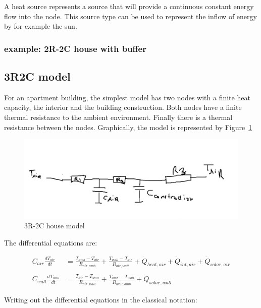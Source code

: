 A heat source represents a source that will provide a continuous constant energy flow into the node. This source type can be used to represent the inflow of energy by for example the sun. 

\subsubsection{example: 2R-2C house with buffer}

   
\subsection{3R2C model}

For an apartment building, the simplest model has two nodes with a finite heat capacity, the interior and the building construction. Both nodes have a finite thermal resistance to the ambient environment. Finally there is a thermal resistance between the nodes. Graphically, the model is represented by Figure~\ref{fig:3R2C}

\begin{figure}[H]
	\centering
	\includegraphics[width=0.7\columnwidth]{Pictures/3R2Cmodel}
	\caption[Short title]{3R-2C house model}
	\label{fig:3R2C}
\end{figure} 

The differential equations are:

\begin{equation}
	\begin{aligned}
		C_{air}\frac{dT_{air}}{dt} &=\frac{T_{amb}-T_{air}}{R_{air, amb}} + \frac{T_{wall}-T_{air}}{R_{air, wall}} + \dot{Q}_{heat, air} + \dot{Q}_{int, air} + \dot{Q}_{solar, air} 
		\\ \\
		C_{wall}\frac{dT_{wall}}{dt} &=\frac{T_{air}-T_{wall}}{R_{air, wall}} + \frac{T_{amb}-T_{wall}}{R_{wall, amb}} +\dot{Q}_{solar, wall}
	\end{aligned}
\end{equation}

Writing out the differential equations in the classical notation:

